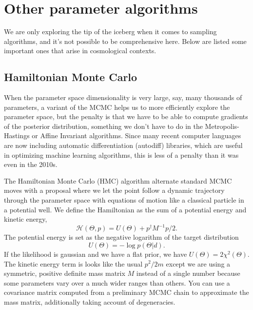 
\section{Other parameter algorithms}
We are only exploring the tip of the iceberg when it comes to sampling algorithms, and it's not possible to be comprehensive here.  Below are listed some important ones that arise in cosmological contexts.

\subsection{Hamiltonian Monte Carlo}
When the parameter space dimensionality is very large, say, many thousands of parameters, a variant of the MCMC helps us to more efficiently explore the parameter space, but the penalty is that we have to be able to compute gradients of the posterior distribution, something we don't have to do in the Metropolis-Hastings or Affine Invariant algorithms.  Since many recent computer languages are now including automatic differentiation (autodiff) libraries, which are useful in optimizing machine learning algorithms, this is less of a penalty than it was even in the 2010s.

The Hamiltonian Monte Carlo (HMC) algorithm alternate standard MCMC moves with a proposal where we let the point follow a dynamic trajectory through the parameter space with equations of motion like a classical particle in a potential well. We define the Hamiltonian as the sum of a potential energy and kinetic energy,
\begin{equation}
  \mathcal{H}(\Theta,p) = U(\Theta) + p^\dag M^{-1} p/2.
\end{equation}
The potential energy is set as the negative logarithm of the target distribution
\begin{equation}
  U(\Theta) = - \log p(\Theta|d).
\end{equation}
If the likelihood is gaussian and we have a flat prior, we have $U(\Theta) = 2\chi^2(\Theta)$.  The kinetic energy term is looks like the usual $p^2/2m$ except we are using a symmetric, positive definite mass matrix $M$ instead of a single number because some parameters vary over a much wider ranges than others.  You can use a covariance matrix computed from a preliminary MCMC chain to approximate the mass matrix, additionally taking account of degeneracies.

